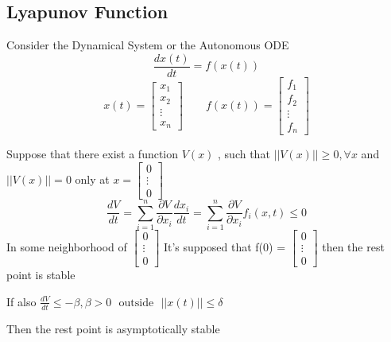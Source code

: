 \subsection{Lyapunov Function}
Consider the Dynamical System or the Autonomous ODE
\[
    \frac{dx(t)}{dt} = f(x(t))
\]
\[
    x(t) = \begin{bmatrix}
        x_{1}  \\
        x_{2}  \\
        \vdots \\
        x_{n}
    \end{bmatrix}
    \qquad
    f(x(t)) = \begin{bmatrix}
        f_{1}  \\
        f_{2}  \\
        \vdots \\
        f_{n}
    \end{bmatrix}
\]
\begin{theorem}
    Suppose that there exist a function $V(x)$ , such that $||V(x)|| \geq 0 , \forall x$ and $||V(x)|| = 0$ only at $x = \begin{bmatrix}
            0      \\
            \vdots \\
            0 
        \end{bmatrix}$
    \[
        \frac{dV}{dt} = \sum_{i=1}^{n} \frac{\partial V}{\partial x_i}\frac{d x_i}{dt}
        = \sum_{i=1}^{n} \frac{\partial V}{\partial x_i} f_i(x,t) \leq 0
    \]
    In some neighborhood of $\begin{bmatrix}
            0      \\
            \vdots \\
            0 
        \end{bmatrix}$
    It's supposed that f(0) = $\begin{bmatrix}
            0      \\
            \vdots \\
            0
        \end{bmatrix}$ then the rest point is stable

    If also $\displaystyle \frac{dV}{dt} \leq -\beta ,  \beta > 0 \ \ \ \text{outside} \ \ \ ||x(t)|| \leq \delta $

    Then the rest point is asymptotically stable
\end{theorem}
